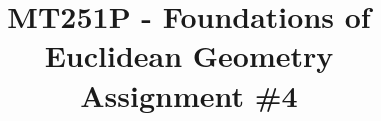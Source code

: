 \documentclass{article}
\title{
    \vspace{2in}
        \textmd{\textbf{MT251P - Foundations of Euclidean Geometry}}\\
    \vspace{1in}
    \textmd{\textbf{Assignment \#4}}\\
    \vspace{1in}
}
\author{
    \hmwkAuthorName\\
    \hmwkStudentnum
}
\date{}
\begin{document}
\maketitle

\pagebreak
\end{document}
